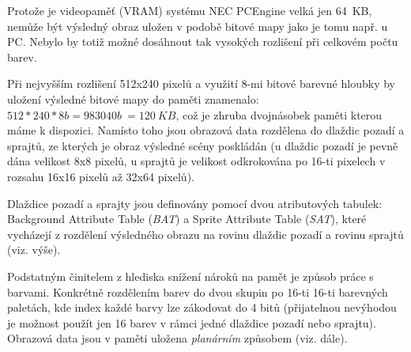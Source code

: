 Protože je videopaměť (VRAM) systému NEC PCEngine velká jen 64~KB, nemůže být
výsledný obraz uložen v podobě bitové mapy jako je tomu např. u PC. Nebylo by
totiž možné dosáhnout tak vysokých rozlišení při celkovém počtu barev.

Při nejvyšším rozlišení 512x240 pixelů a využití 8-mi bitové barevné hloubky by
uložení výsledné bitové mapy do paměti znamenalo: $512 * 240 * 8b = 983 040b ~=
120~KB$, což je zhruba dvojnásobek paměti kterou máme k dispozici. Namísto toho
jsou obrazová data rozdělena do dlaždic pozadí a sprajtů, ze kterých je obraz
výsledné scény poskládán (u dlaždic pozadí je pevně dána velikost 8x8 pixelů, u
sprajtů je velikost odkrokována po 16-ti pixelech v rozsahu 16x16 pixelů až
32x64 pixelů).

Dlaždice pozadí a sprajty jsou definovány pomocí dvou atributových tabulek:
Background Attribute Table ({\it BAT}) a Sprite Attribute Table ({\it SAT}),
které vycházejí z rozdělení výsledného obrazu na rovinu dlaždic pozadí a rovinu
sprajtů (viz. výše).

Podstatným činitelem z hlediska snížení nároků na pamět je způsob práce s
barvami. Konkrétně rozdělením barev do dvou skupin po 16-ti 16-ti barevných
paletách, kde index každé barvy lze zákodovat do 4 bitů (přijatelnou nevýhodou
je možnost použít jen 16 barev v rámci jedné dlaždice pozadí nebo sprajtu).
Obrazová data jsou v paměti uložena {\em planárním} způsobem (viz. dále).

